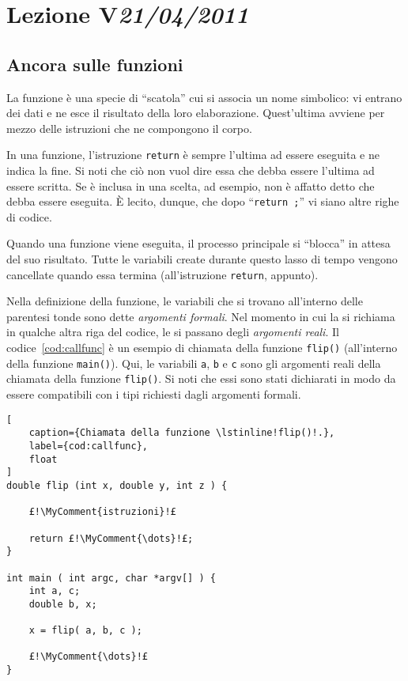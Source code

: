 \chapter[Lezione V]{Lezione V\newline\small{\emph{21/04/2011}}}
	\section{Ancora sulle funzioni}
	\label{sec:fun2}
La funzione è una specie di ``scatola'' cui si associa un nome simbolico: vi entrano dei dati e ne esce il risultato della loro elaborazione.
Quest'ultima avviene per mezzo delle istruzioni che ne compongono il corpo.

In  una funzione, l'istruzione \lstinline!return! è sempre l'ultima ad essere eseguita e ne indica la fine.
Si noti che ciò non vuol dire essa che debba essere l'ultima ad essere scritta.
Se è inclusa in una scelta, ad esempio, non è affatto detto che debba essere eseguita.
\`E lecito, dunque, che dopo ``\lstinline$return $\MyComment{\dots}\lstinline$;$'' vi siano altre righe di codice.

Quando una funzione viene eseguita, il processo principale si ``blocca'' in attesa del suo risultato.
Tutte le variabili create durante questo lasso di tempo vengono cancellate quando essa termina (all'istruzione \lstinline!return!, appunto). 

Nella definizione della funzione, le variabili che si trovano all'interno delle parentesi tonde sono dette \emph{argomenti formali}.
Nel momento in cui la si richiama in qualche altra riga del codice, le si passano degli \emph{argomenti reali}.
Il codice~\ref{cod:callfunc} è un esempio di chiamata della funzione \lstinline!flip()! (all'interno della funzione \lstinline!main()!).
Qui, le variabili \lstinline!a!, \lstinline!b! e \lstinline!c! sono gli argomenti reali della chiamata della funzione \lstinline!flip()!.
Si noti che essi sono stati dichiarati in modo da essere compatibili con i tipi richiesti dagli argomenti formali.
\begin{lstlisting}[
	caption={Chiamata della funzione \lstinline!flip()!.},
	label={cod:callfunc},
	float
]
double flip (int x, double y, int z ) {

	£!\MyComment{istruzioni}!£

	return £!\MyComment{\dots}!£;
}

int main ( int argc, char *argv[] ) {
	int a, c;
	double b, x;

	x = flip( a, b, c );

	£!\MyComment{\dots}!£
}
\end{lstlisting}


